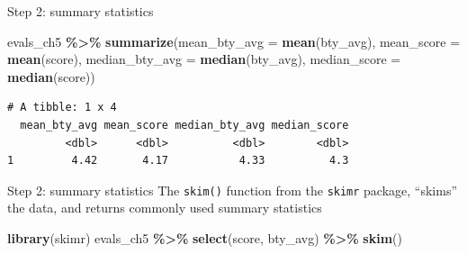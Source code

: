 \documentclass[
  ignorenonframetext,
]{beamer}
\newenvironment{Shaded}{\begin{snugshade}}{\end{snugshade}}
\newcommand{\AttributeTok}[1]{\textcolor[rgb]{0.13,0.29,0.53}{#1}}
\newcommand{\FunctionTok}[1]{\textcolor[rgb]{0.13,0.29,0.53}{\textbf{#1}}}
\newcommand{\NormalTok}[1]{#1}
\newcommand{\SpecialCharTok}[1]{\textcolor[rgb]{0.81,0.36,0.00}{\textbf{#1}}}
\begin{document}
\begin{frame}[fragile]{Step 2: summary statistics}
\protect\hypertarget{step-2-summary-statistics}{}
\normalsize

\begin{Shaded}
\begin{Highlighting}[]
\NormalTok{evals\_ch5 }\SpecialCharTok{\%\textgreater{}\%}
  \FunctionTok{summarize}\NormalTok{(}\AttributeTok{mean\_bty\_avg =} \FunctionTok{mean}\NormalTok{(bty\_avg),}
            \AttributeTok{mean\_score =} \FunctionTok{mean}\NormalTok{(score),}
            \AttributeTok{median\_bty\_avg =} \FunctionTok{median}\NormalTok{(bty\_avg), }
            \AttributeTok{median\_score =} \FunctionTok{median}\NormalTok{(score))}
\end{Highlighting}
\end{Shaded}

\begin{verbatim}
# A tibble: 1 x 4
  mean_bty_avg mean_score median_bty_avg median_score
         <dbl>      <dbl>          <dbl>        <dbl>
1         4.42       4.17           4.33          4.3
\end{verbatim}

\normalsize
\end{frame}

\begin{frame}[fragile]{Step 2: summary statistics}
\protect\hypertarget{step-2-summary-statistics-1}{}
The \texttt{skim()} function from the \texttt{skimr} package, ``skims''
the data, and returns commonly used summary statistics

\normalsize

\begin{Shaded}
\begin{Highlighting}[]
\FunctionTok{library}\NormalTok{(skimr)}
\NormalTok{evals\_ch5 }\SpecialCharTok{\%\textgreater{}\%} 
  \FunctionTok{select}\NormalTok{(score, bty\_avg) }\SpecialCharTok{\%\textgreater{}\%} 
  \FunctionTok{skim}\NormalTok{()}
\end{Highlighting}
\end{Shaded}

\normalsize
\end{frame}
\end{document}
